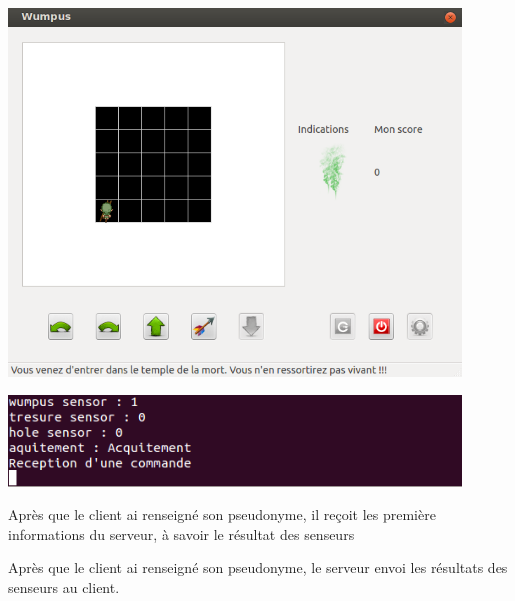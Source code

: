 \documentclass[a4paper,10pt]{article}
\begin{document}
		
		\begin{minipage}[t]{0.46\textwidth}
			\vspace{2pt}
			\centering
			\includegraphics[width=0.9\textwidth]{JeuxDEssais/Wumpus3.png}
		\end{minipage}
		\hfill
		\begin{minipage}[t]{0.46\textwidth}
			\vspace{20pt}
			\centering
			\includegraphics[width=0.9\textwidth]{JeuxDEssais/Serveur3.png}
		\end{minipage}

		\begin{minipage}[t]{0.46\textwidth}
			\vspace{2pt}
			Après que le client ai renseigné son pseudonyme, il reçoit les première informations du serveur, à savoir le résultat des senseurs
		\end{minipage}
		\hfill
		\begin{minipage}[t]{0.46\textwidth}
			\vspace{2pt}
			Après que le client ai renseigné son pseudonyme, le serveur envoi les résultats des senseurs au client.
		\end{minipage}\\

\end{document}
